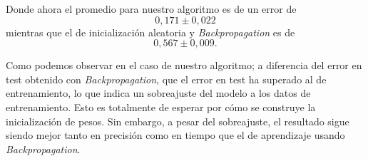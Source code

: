 Donde ahora el promedio para nuestro algoritmo es de un error de
\begin{equation}
    0,171 \pm 0,022
\end{equation}
mientras que el de inicialización aleatoria y \textit{Backpropagation} es de 
\begin{equation}
    0,567 \pm 0,009.
\end{equation}

Como podemos observar en el caso de nuestro 
algoritmo; a diferencia del error en test obtenido con \textit{Backpropagation}, que el error en test ha superado al de entrenamiento, lo que indica un sobreajuste 
del modelo a los datos de entrenamiento. Esto es totalmente de esperar por 
cómo se construye la inicialización de pesos. Sin embargo, a pesar del sobreajuste, el resultado sigue siendo mejor tanto en precisión como en tiempo que el de aprendizaje usando \textit{Backpropagation}.  



\newpage

